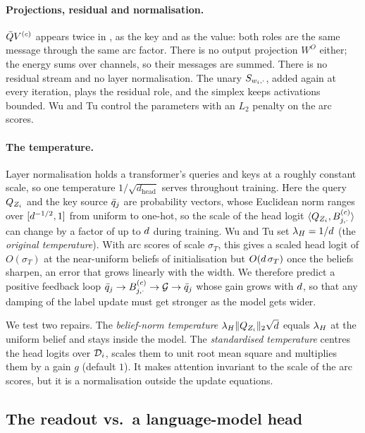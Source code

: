 \paragraph{Projections, residual and normalisation.}
$\bar{Q}V^{(c)}$ appears twice in , as the key and as the value: both roles are
the same message through the same arc factor. There is no output projection $W^O$ either; the
energy sums over channels, so their messages are summed. There is no residual stream and no
layer normalisation. The unary $S_{w_i,\cdot}$, added
again at every iteration, plays the residual role, and the simplex keeps activations bounded. Wu
and Tu control the parameters with an $L_2$ penalty on the arc scores.

\paragraph{The temperature.}
\label{sec:temperature}
Layer normalisation holds a transformer's queries and keys at a roughly constant scale, so one
temperature $1/\sqrt{d_{\text{head}}}$ serves throughout training. Here the query
$Q_{Z_{i}}$ and the key source $\bar{q}_{j}$ are probability vectors, whose Euclidean norm ranges over
$[d^{-1/2}, 1]$ from uniform to one-hot, so the scale of the head logit
$\langle Q_{Z_{i}}, B^{(c)}_{j,\cdot}\rangle$ can change by a factor of up to $d$ during
training. Wu and Tu set $\lambda_H = 1/d$ (the \emph{original temperature}). With arc scores of
scale $\sigma_T$, this gives a scaled head logit of $O(\sigma_T)$ at the near-uniform beliefs of
initialisation but $O(d\,\sigma_T)$ once the beliefs sharpen, an error that grows linearly
with the width. We therefore predict a
positive feedback loop $\bar{q}_{j} \to B^{(c)}_{j,\cdot} \to \mathcal{G} \to \bar{q}_{j}$ whose gain
grows with $d$, so that any damping of the label update must get stronger as the model gets
wider.

We test two repairs. The \emph{belief-norm temperature} $\lambda_H\|Q_{Z_{i}}\|_2\sqrt{d}$ equals
$\lambda_H$ at the uniform belief and stays inside the model. The \emph{standardised temperature}
centres the head logits over $\mathcal{D}_{i}$, scales them to unit root mean square and multiplies them
by a gain $g$ (default $1$). It makes attention invariant to the scale of the arc scores, but it
is a normalisation outside the update equations.

\subsection{The readout vs.\ a language-model head}
\label{sec:cmp-readout}

